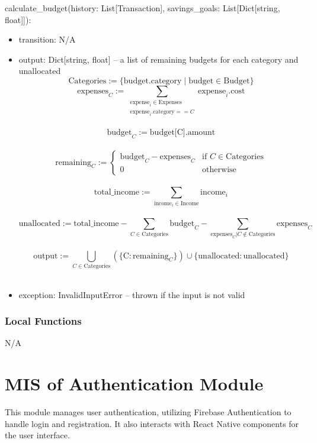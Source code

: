 \documentclass[12pt, titlepage]{article}
\begin{document}
\noindent calculate\_budget(history: List[Transaction], savings\_goals: List[Dict[string, float]]):
\begin{itemize}
\item transition: N/A
\item output: Dict[string, float] -- a list of remaining budgets for each
category and unallocated\\
\[
\text{Categories} := \{ \text{budget.category} \mid \text{budget} \in \text{Budget} \}
\]
\[
\text{expenses}_C := \sum_{\substack{\text{expense}_i \in \text{Expenses} \\ \text{expense}_i.\text{category} == C}} \text{expense}_i.\text{cost}
\]\\
\[
\text{budget}_C := \text{budget[C]}.\text{amount}
\]\\
\[
\text{remaining}_C := 
\begin{cases} 
\text{budget}_C - \text{expenses}_C & \text{if } C \in \text{Categories} \\
0 & \text{otherwise}
\end{cases}
\]\\
\[
\text{total\_income} := \sum_{\text{income}_i \in \text{Income}} \text{income}_i
\]\\
\[
\text{unallocated} := \text{total\_income} - \sum_{C \in \text{Categories}} \text{budget}_C - \sum_{ \text{expenses}_C | C \notin \text{Categories}} \text{expenses}_C
\]\\
\[
\text{output} := \bigcup_{C \in \text{Categories}} \left( \{\text{C} : \text{remaining}_C \} \right) \cup \{\text{unallocated}: \text{unallocated} \}
\]\\
\item exception: InvalidInputError -- thrown if the input is not valid
\end{itemize}

\subsubsection{Local Functions}
N/A

\newpage


\section{MIS of Authentication Module}\label{Authentication_Module}
This module manages user authentication, utilizing Firebase Authentication to handle login and registration. It also interacts with React Native components for the user interface.
\end{document}
